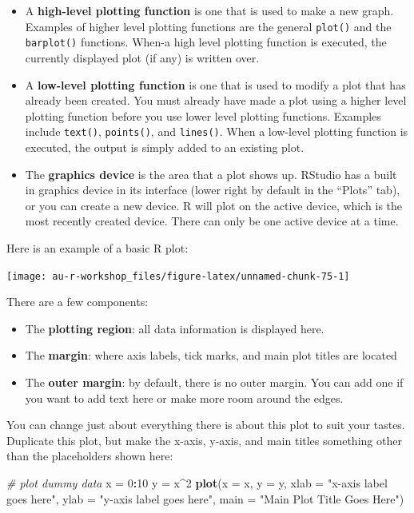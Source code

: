 \documentclass[]{book}
\newenvironment{Shaded}{\begin{snugshade}}{\end{snugshade}}
\newcommand{\KeywordTok}[1]{\textcolor[rgb]{0.13,0.29,0.53}{\textbf{#1}}}
\newcommand{\DataTypeTok}[1]{\textcolor[rgb]{0.13,0.29,0.53}{#1}}
\newcommand{\DecValTok}[1]{\textcolor[rgb]{0.00,0.00,0.81}{#1}}
\newcommand{\StringTok}[1]{\textcolor[rgb]{0.31,0.60,0.02}{#1}}
\newcommand{\CommentTok}[1]{\textcolor[rgb]{0.56,0.35,0.01}{\textit{#1}}}
\newcommand{\OperatorTok}[1]{\textcolor[rgb]{0.81,0.36,0.00}{\textbf{#1}}}
\newcommand{\NormalTok}[1]{#1}
\providecommand{\tightlist}{%
  \setlength{\itemsep}{0pt}\setlength{\parskip}{0pt}}
\theoremstyle{definition}
\theoremstyle{definition}
\theoremstyle{definition}
\theoremstyle{remark}
\begin{document}
\begin{itemize}
\tightlist
\item
  A \textbf{high-level plotting function} is one that is used to make a
  new graph. Examples of higher level plotting functions are the general
  \texttt{plot()} and the \texttt{barplot()} functions. When-a high
  level plotting function is executed, the currently displayed plot (if
  any) is written over.
\item
  A \textbf{low-level plotting function} is one that is used to modify a
  plot that has already been created. You must already have made a plot
  using a higher level plotting function before you use lower level
  plotting functions. Examples include \texttt{text()},
  \texttt{points()}, and \texttt{lines()}. When a low-level plotting
  function is executed, the output is simply added to an existing plot.
\item
  The \textbf{graphics device} is the area that a plot shows up. RStudio
  has a built in graphics device in its interface (lower right by
  default in the ``Plots'' tab), or you can create a new device. R will
  plot on the active device, which is the most recently created device.
  There can only be one active device at a time.
\end{itemize}

Here is an example of a basic R plot:

\begin{center}\texttt{[image: au-r-workshop\_files/figure-latex/unnamed-chunk-75-1]} \end{center}

There are a few components:

\begin{itemize}
\tightlist
\item
  The \textbf{plotting region}: all data information is displayed here.
\item
  The \textbf{margin}: where axis labels, tick marks, and main plot
  titles are located
\item
  The \textbf{outer margin}: by default, there is no outer margin. You
  can add one if you want to add text here or make more room around the
  edges.
\end{itemize}

You can change just about everything there is about this plot to suit
your tastes. Duplicate this plot, but make the x-axis, y-axis, and main
titles something other than the placeholders shown here:

\begin{Shaded}
\begin{Highlighting}[]
\CommentTok{# plot dummy data}
\NormalTok{x =}\StringTok{ }\DecValTok{0}\OperatorTok{:}\DecValTok{10}
\NormalTok{y =}\StringTok{ }\NormalTok{x}\OperatorTok{^}\DecValTok{2}
\KeywordTok{plot}\NormalTok{(}\DataTypeTok{x =}\NormalTok{ x, }\DataTypeTok{y =}\NormalTok{ y,}
     \DataTypeTok{xlab =} \StringTok{"x-axis label goes here"}\NormalTok{, }
     \DataTypeTok{ylab =} \StringTok{"y-axis label goes here"}\NormalTok{,}
     \DataTypeTok{main =} \StringTok{"Main Plot Title Goes Here"}\NormalTok{)}
\end{Highlighting}
\end{Shaded}
\end{document}
